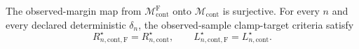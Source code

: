 The observed-margin map from \(\mathcal M_{\mathrm{cont}}^{\mathrm F}\) onto \(\mathcal M_{\mathrm{cont}}\) is surjective.  For every \(n\) and every declared deterministic \(\delta_n\), the observed-sample clamp-target criteria satisfy
\[
 R_{n,\mathrm{cont},\mathrm F}^\star=R_{n,\mathrm{cont}}^\star,
 \qquad
 L_{n,\mathrm{cont},\mathrm F}^\star=L_{n,\mathrm{cont}}^\star.
\]